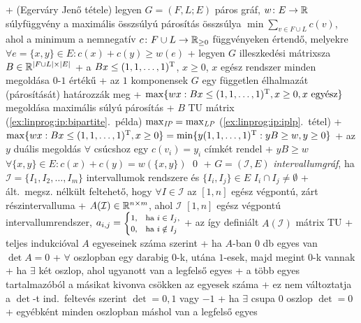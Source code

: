 
+ \thm (Egerváry Jenő tétele) legyen $G = (F, L; E)$ páros gráf, $w\colon E
  \to \mathbb{R}$ súlyfüggvény \RA a maximális összsúlyú párosítás összsúlya
  $\min \sum_{v \in F \cup L} c(v)$, ahol a minimum
  a nemnegatív $c\colon F \cup L \to \mathbb{R}_{\ge 0}$ függvényeken értendő, melyekre
  $\forall e = \{x, y\} \in E: c(x) + c(y) \ge w(e)$
  + \proof legyen $G$ illeszkedési mátrixsza $B \in
    \mathbb{R}^{\lvert F \cup L \rvert \times \lvert E \rvert}$
  + a $B x \le (1, 1, \ldots, 1)^{\mathrm{T}}$, $x \ge 0$, $x$ egész rendszer
    minden megoldása $0$-$1$ értékű
    + az $1$ komponensek $G$ egy független élhalmazát (párosítását)
      határozzák meg
  + $\max \{ wx : Bx \le (1, 1, \ldots, 1)^{\mathrm{T}}, x \ge 0, x \text{
    egyész} \}$ megoldása maximális súlyú párosítás
  + $B$ TU mátrix (\ref{ex:linprog:ip:bipartite}.~példa) \RA
    $\max_{\textit{IP}} = \max_{\textit{LP}}$ (\ref{ex:linprog:ip:iplp}.~tétel)
  + $\max \{ wx : Bx \le (1, 1, \ldots, 1)^{\mathrm{T}}, x \ge 0 \} = \min \{ y
    (1, 1, \ldots, 1)^{\mathrm{T}} : yB \ge w, y \ge 0 \}$
  + az $y$ duális megoldás $\forall$ csúcshoz egy $c(v_i) = y_i$
    címkét rendel
    + $y B \ge w$ \RA $\forall \{x, y\} \in E: c(x) + c(y) = w(\{x,
    y\})$ \qed
+ \dfn $G = (\mathcal{I}, E)$ \emph{intervallumgráf}, ha $\mathcal{I}
  = \{I_1, I_2, \ldots, I_m \}$ intervallumok rendszere és $\{ I_i, I_j
  \} \in E$ \LRA $I_i \cap I_j \ne \emptyset$
  + ált.~megsz. nélkült feltehető, hogy $\forall I \in \mathcal{I}$ az $[1, n]$
  egész végpontú, zárt részintervalluma
+ $A(\mathcal{I}) \in \mathbb{R}^{n \times m}$, ahol $\mathcal{I}$ $[1, n]$ egész
  végpontú intervallumrendszer, $a_{i, j} = \text{\footnotesize$\begin{cases}
      1, &\text{ha $i \in I_j$,} \\
      0, &\text{ha $i \notin I_j$}
    \end{cases}$}$
  + \lemma az így definiált $A(\mathcal{I})$ mátrix TU
  + \proof teljes indukcióval $A$ egyeseinek száma szerint
    + ha $A$-ban $0$ db egyes van \RA $\det A = 0$
    + $\forall$ oszlopban egy darabig $0$-k, utána $1$-esek, majd
      megint $0$-k vannak
    + ha $\exists$ két oszlop, ahol ugyanott van a legfelső egyes
      + a több egyes tartalmazóból a másikat kivonva csökken az
        egyesek száma
      + ez nem változtatja a $\det$-t \RA ind.~feltevés szerint
        $\det = 0, 1$ vagy $-1$
    + ha $\exists$ csupa $0$ oszlop \RA $\det = 0$
    + egyébként minden oszlopban máshol van a legfelső egyes
